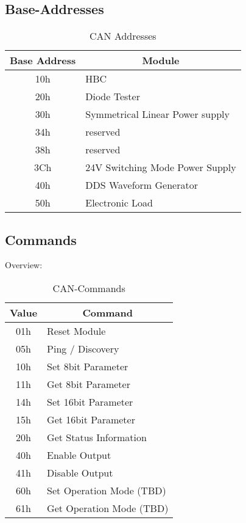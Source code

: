 \subsection{Base-Addresses}
\begin{table}[H]
    \centering
    \begin{tabular}{|c|l|}
        \hline
        \textbf{Base Address}   &   \multicolumn{1}{|c|}{\textbf{Module}}\\ \hline \hline
        10h    &   HBC    \\ \hline
        20h    &   Diode Tester \\ \hline
        30h    &   Symmetrical Linear Power supply \\ \hline
        34h    &   reserved \\ \hline
        38h    &   reserved \\ \hline
        3Ch    &   24V Switching Mode Power Supply \\\hline
        40h    &   DDS Waveform Generator \\ \hline
        50h    &   Electronic Load \\ \hline
    \end{tabular}
    \caption{CAN Addresses}
    \label{tab:CAN-ADD}
\end{table}


\subsection{Commands}
Overview:
\begin{table}[H]
    \centering
    \begin{tabular}{|c|l|}
        \hline
        \textbf{Value}   &   \multicolumn{1}{|c|}{\textbf{Command}}\\ \hline \hline \hline
        01h    &   Reset Module \\ \hline
        05h    &   Ping / Discovery \\ \hline
        \hline
        10h    &   Set 8bit Parameter    \\ \hline
        11h    &   Get 8bit Parameter     \\ \hline
        14h    &   Set 16bit Parameter   \\ \hline
        15h    &   Get 16bit Parameter    \\ \hline 
        \hline
        20h    &   Get Status Information \\ \hline 
        \hline
        40h    &   Enable Output       \\ \hline
        41h    &   Disable Output      \\ \hline 
        \hline
        60h    &   Set Operation Mode  (TBD)\\ \hline
        61h    &   Get Operation Mode  (TBD)\\ \hline 
    \end{tabular}
    \caption{CAN-Commands}
\label{tab:CAN-Commands}
\end{table}

